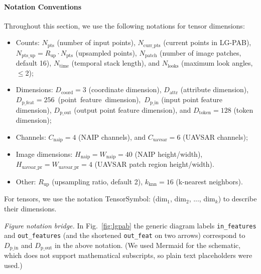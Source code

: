 \documentclass[remotesensing,article,accept,pdftex,moreauthors]{Definitions/mdpi}
\begin{document}
\paragraph{Notation Conventions}
Throughout this section, we use the following notations for tensor dimensions:
\begin{itemize}
    \item Counts: $N_{\text{pts}}$ (number of input points), $N_{\text{curr\_pts}}$ (current points in LG-PAB), \mbox{$N_{\text{pts\_up}} = R_{\text{up}} \cdot N_{\text{pts}}$} (upsampled points), $N_{\text{patch}}$ (number of image patches, default 16), $N_{\text{time}}$ (temporal stack length), and $N_{\text{looks}}$ (maximum look angles, $\leq$2);
    \item Dimensions: $D_{\text{coord}} = 3$ (coordinate dimension), $D_{\text{attr}}$ (attribute dimension), \mbox{$D_{\text{p\_feat}} = 256$ (point feature dimension), $D_{\text{p\_in}}$} (input point feature dimension), $D_{\text{p\_out}}$ (output point feature dimension), and $D_{\text{token}} = 128$ (token dimension);
    \item Channels: $C_{\text{naip}} = 4$ (NAIP channels), and $C_{\text{uavsar}} = 6$ (UAVSAR channels);
    \item Image dimensions: $H_{\text{naip}} = W_{\text{naip}} = 40$ (NAIP height/width), $H_{\text{uavsar\_pr}} = W_{\text{uavsar\_pr}} = 4$ (UAVSAR patch region height/width).
    \item Other: $R_{\text{up}}$ (upsampling ratio, default 2), $k_{\text{knn}} = 16$ (k-nearest neighbors).
\end{itemize}
For tensors, we use the notation TensorSymbol: (dim$_1$, dim$_2$, ..., dim$_k$) to describe their dimensions.

\noindent\textit{Figure notation bridge.} In Fig.~\ref{fig:lgpab} the generic diagram labels \texttt{in\_features} and \texttt{out\_features} (and the shortened \texttt{out\_feat} on two arrows) correspond to $D_{\text{p\_in}}$ and $D_{\text{p\_out}}$ in the above notation. (We used Mermaid for the schematic, which does not support mathematical subscripts, so plain text placeholders were used.)
\end{document}

